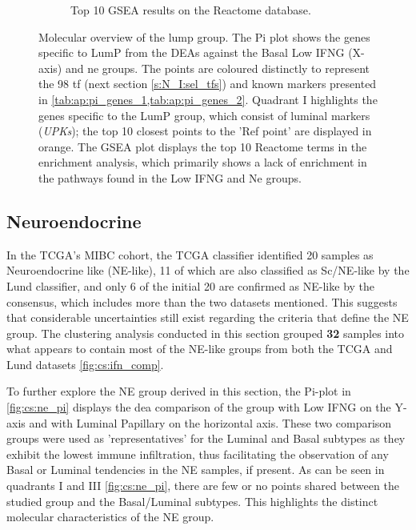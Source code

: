 \begin{figure}[H]
\begin{subfigure}[!t]{0.91\textwidth}
        \caption{Top 10 GSEA results on the Reactome database.}
        \label{fig:cs:lumP_gsea}
    \end{subfigure} 
    \centering
    \caption{Molecular overview of the \acrfull{lump} group. The Pi plot shows the genes specific to LumP from the DEAs against the Basal Low IFNG (X-axis) and \acrlong{ne} groups. The points are coloured distinctly to represent the 98 \acrlong{tf} (next section \cref{s:N_I:sel_tfs}) and known markers presented in \cref{tab:ap:pi_genes_1,tab:ap:pi_genes_2}. Quadrant I highlights the genes specific to the LumP group, which consist of luminal markers (\textit{UPKs}); the top 10 closest points to the 'Ref point' are displayed in orange. The GSEA plot displays the top 10 Reactome terms in the enrichment analysis, which primarily shows a lack of enrichment in the pathways found in the Low IFNG and Ne groups.}
    \label{fig:cs:lump}
\end{figure}


\subsection{Neuroendocrine} \label{s:cs:ne_interp}


In the TCGA's MIBC cohort, the TCGA classifier \citet{Robertson2017-mg} identified 20 samples as Neuroendocrine like (NE-like), 11 of which are also classified as Sc/NE-like by the Lund classifier, and only 6 of the initial 20 are confirmed as NE-like by the consensus, which includes more than the two datasets mentioned. This suggests that considerable uncertainties still exist regarding the criteria that define the NE group. The clustering analysis conducted in this section grouped \textbf{32} samples into what appears to contain most of the NE-like groups from both the TCGA and Lund datasets \cref{fig:cs:ifn_comp}.

To further explore the NE group derived in this section, the Pi-plot in \cref{fig:cs:ne_pi} displays the \acrshort{dea} comparison of the group with Low IFNG on the Y-axis and with Luminal Papillary on the horizontal axis. These two comparison groups were used as 'representatives' for the Luminal and Basal subtypes as they exhibit the lowest immune infiltration, thus facilitating the observation of any Basal or Luminal tendencies in the NE samples, if present. As can be seen in quadrants I and III \cref{fig:cs:ne_pi}, there are few or no points shared between the studied group and the Basal/Luminal subtypes. This highlights the distinct molecular characteristics of the NE group.


